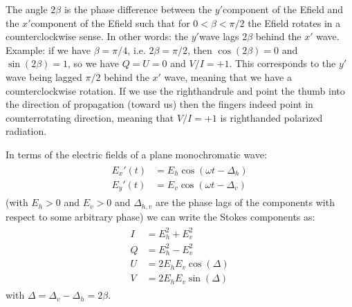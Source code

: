 \documentclass[letterpaper,10pt,english]{sphinxmanual}
\begin{document}
The angle \(2\beta\) is the phase difference between the
\(y'\)\sphinxhyphen{}component of the E\sphinxhyphen{}field and the \(x'\)\sphinxhyphen{}component of the E\sphinxhyphen{}field
such that for \(0<\beta<\pi/2\) the E\sphinxhyphen{}field rotates in a counter\sphinxhyphen{}clockwise
sense. In other words: the \(y'\)\sphinxhyphen{}wave lags \(2\beta\) behind the
\(x'\) wave. Example: if we have \(\beta=\pi/4\), i.e.
\(2\beta=\pi/2\), then \(\cos(2\beta)=0\) and \(\sin(2\beta)=1\), so
we have \(Q=U=0\) and \(V/I=+1\). This corresponds to the \(y'\)
wave being lagged \(\pi/2\) behind the \(x'\) wave, meaning that we have
a counter\sphinxhyphen{}clockwise rotation. If we use the right\sphinxhyphen{}hand\sphinxhyphen{}rule and point the thumb
into the direction of propagation (toward us) then the fingers indeed point in
counter\sphinxhyphen{}rotating direction, meaning that \(V/I=+1\) is righthanded polarized
radiation.

In terms of the  electric fields of a plane monochromatic wave:
\begin{equation*}
\begin{split}\begin{split}
E_x'(t) &= E_h \cos(\omega t-\Delta_h)\\
E_y'(t) &= E_v \cos(\omega t-\Delta_v)
\end{split}\end{split}
\end{equation*}
(with \(E_h>0\) and \(E_v>0\) and \(\Delta_{h,v}\) are the phase
lags of the components with respect to some arbitrary phase) we can write the
Stokes components as:
\begin{equation*}
\begin{split}\begin{split}
I &= E_h^2 + E_v^2 \\
Q &= E_h^2 - E_v^2\\
U &= 2 E_h E_v \cos(\Delta) \\
V &= 2 E_h E_v \sin(\Delta)
\end{split}\end{split}
\end{equation*}
with \(\Delta = \Delta_v - \Delta_h = 2\beta\).
\end{document}
